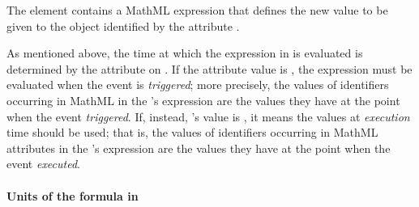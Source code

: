 The  element contains a MathML expression that defines
the new value to be given to the object identified by the
\EventAssignment attribute .

As mentioned above, the time at which the expression in
 is evaluated is determined by the attribute
 on \Event.  If the attribute
value is , the expression must be evaluated when the
event is \emph{triggered}; more precisely, the values of identifiers
occurring in MathML   in the
\EventAssignment's  expression are the values they
have at the point when the event \emph{triggered}.  If, instead,
's value is , it means
the values at \emph{execution} time should be used; that is, the
values of identifiers occurring in MathML  attributes in
the \EventAssignment's  expression are the values they
have at the point when the event \emph{executed}.


\paragraph{Units of the  formula in }

